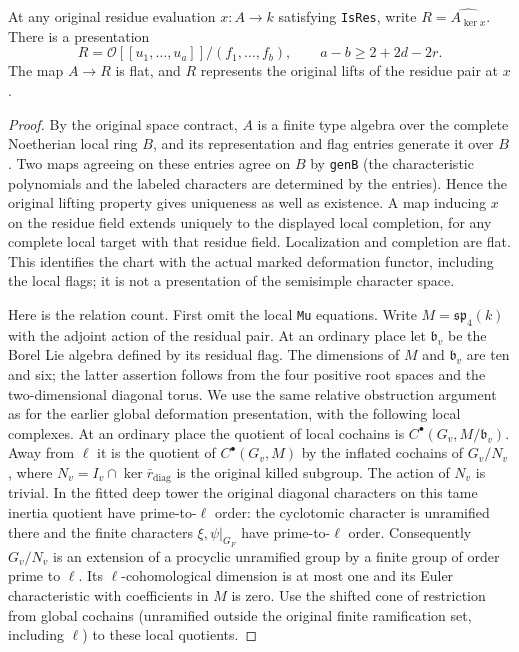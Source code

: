 \begin{lemma}
\label{lem:rh-four-chart-deficit}
At any original residue evaluation $x:A\to k$ satisfying
\texttt{IsRes}, write $R=\widehat{A_{\ker x}}$.
There is a presentation
\[
 R=\mathcal O[[u_1,\ldots,u_a]]/(f_1,\ldots,f_b),
 \qquad a-b\geq 2+2d-2r.
\]
The map $A\to R$ is flat, and $R$ represents the original lifts
of the residue pair at $x$.
\end{lemma}
\begin{proof}
By the original space contract, $A$ is a finite type algebra over
the complete Noetherian local ring $B$, and its representation
and flag entries generate it over $B$. Two maps agreeing on
these entries agree on $B$ by \texttt{genB} (the characteristic
polynomials and the labeled characters are determined by the
entries). Hence the original lifting property gives uniqueness
as well as existence. A map inducing $x$ on the residue field
extends uniquely to the displayed local completion, for any
complete local target with that residue field. Localization and
completion are flat. This identifies the chart with the actual
marked deformation functor, including the local flags; it is
not a presentation of the semisimple character space.

Here is the relation count. First omit the local \texttt{Mu}
equations. Write $M=\mathfrak{sp}_4(k)$ with the adjoint action
of the residual pair. At an ordinary place let $\mathfrak b_v$
be the Borel Lie algebra defined by its residual flag.
The dimensions of $M$ and $\mathfrak b_v$ are ten and six;
the latter assertion follows from the four positive root
spaces and the two-dimensional diagonal torus. We use the
same relative obstruction argument as for the earlier global
deformation presentation, with the following local complexes.
At an ordinary place the quotient of local cochains is
$C^\bullet(G_v,M/\mathfrak b_v)$. Away from $\ell$ it is the
quotient of $C^\bullet(G_v,M)$ by the inflated cochains of
$G_v/N_v$, where $N_v=I_v\cap\ker \bar r_{\mathrm{diag}}$ is
the original killed subgroup. The action of $N_v$ is trivial.
In the fitted deep tower the original diagonal characters
on this tame inertia quotient have prime-to-$\ell$ order:
the cyclotomic character is unramified there and the finite
characters $\xi,\psi|_{G_F}$ have prime-to-$\ell$ order.
Consequently $G_v/N_v$ is an extension of a procyclic
unramified group by a finite group of order prime to $\ell$.
Its $\ell$-cohomological dimension is at most one and its
Euler characteristic with coefficients in $M$ is zero.
Use the shifted cone of restriction from global cochains
(unramified outside the original finite ramification set,
including $\ell$) to these local quotients.


\end{proof}
